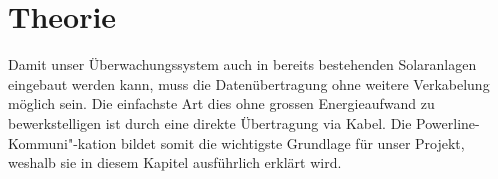 \section{Theorie}

Damit unser Überwachungssystem auch in bereits bestehenden Solaranlagen eingebaut werden kann, muss die Datenübertragung ohne weitere Verkabelung möglich sein. Die einfachste Art dies ohne grossen Energieaufwand zu bewerkstelligen ist durch eine direkte Übertragung via Kabel. Die Powerline-Kommuni"-kation bildet somit die wichtigste Grundlage für unser Projekt, weshalb sie in diesem Kapitel ausführlich erklärt wird. 
